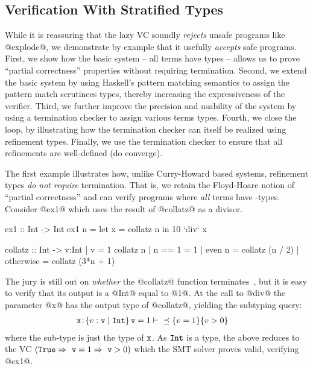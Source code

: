 \subsection{Verification With Stratified Types}\label{sec:overview:examples}
While it is reassuring that the lazy VC soundly \emph{rejects} 
unsafe programs like @explode@, we demonstrate by example
that it usefully \emph{accepts} safe programs.
% 
First, we show how the basic system -- all terms
have \Div types -- allows us to prove ``partial correctness''
properties without requiring termination.
%
Second, we extend the basic system by 
using Haskell's pattern matching semantics to assign 
the pattern match scrutinees \Wnf types, thereby 
increasing the expressiveness of the verifier.
%
Third, we further improve the precision 
and usability of the system by using a termination 
checker to assign various terms \Fin types.
%
Fourth, we close the loop, by illustrating how the 
termination checker can itself be realized using 
refinement types.
%
Finally, we use the termination checker to ensure that
all refinements are well-defined (\ie do converge).

The first example illustrates how, unlike Curry-Howard based
systems, refinement types \emph{do not require} termination. 
%
That is, we retain the Floyd-Hoare notion of ``partial correctness''
and can verify programs where \emph{all} terms have \Div-types.
%
Consider @ex1@ which uses the result of @collatz@ as a divisor.
%
\begin{code}
  ex1   :: Int -> Int 
  ex1 n = let x = collatz n in 10 `div` x 

  collatz :: Int -> {v:Int | v = 1}
  collatz n 
    | n == 1    = 1 
    | even n    = collatz (n / 2)
    | otherwise = collatz (3*n + 1)
\end{code}
%
The jury is still out on \emph{whether} the @collatz@ 
function terminates~\cite{collatzWiki}, but it is easy
to verify that its output is a \Div @Int@ equal to @1@.
%
At the call to @div@ the parameter @x@ has the output type 
of @collatz@, yielding the subtyping query:
%
\begin{align*}
   \tbind{\ttx}{\tref{\ttv}{\ttInt}{}{\ttv=1}} \vdash\ & \subtref{v = 1}{v > 0} 
\end{align*}
% 
where the sub-type is just the type of $\mathtt{x}$. 
As $\mathtt{Int}$ is a \Div type, the above reduces to the VC 
${(\mathtt{True} \Rightarrow\  \mathtt{v} = 1 \Rightarrow\ \mathtt{v} > 0)}$
which the SMT solver proves valid, verifying @ex1@.

